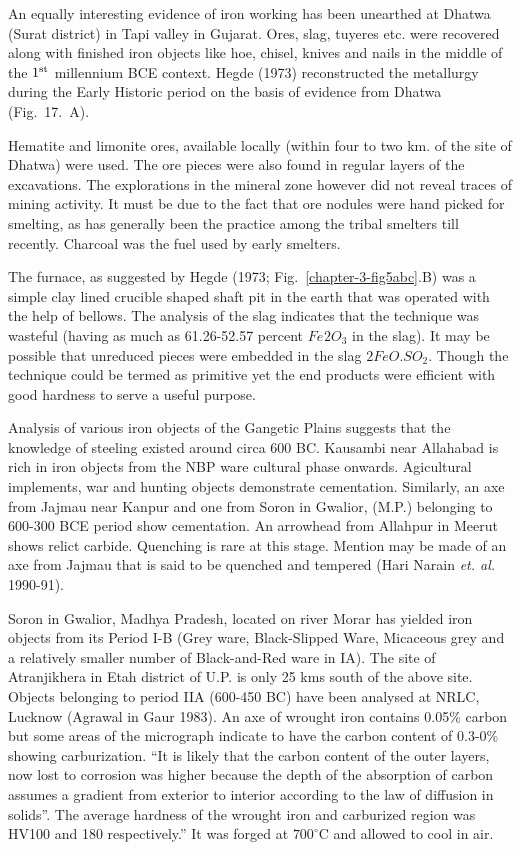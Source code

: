 An equally interesting evidence of iron working has been unearthed at Dhatwa (Surat district) in Tapi valley in Gujarat. Ores, slag, tuyeres etc. were recovered along with finished iron objects like hoe, chisel, knives and nails in the middle of the $1^{\rm st}$ millennium BCE context. Hegde (1973) reconstructed the metallurgy during the Early Historic period on the basis of evidence from Dhatwa (Fig.~17.~A). 

Hematite and limonite ores, available locally (within four to two km. of the site of Dhatwa) were used. The ore pieces were also found in regular layers of the excavations. The explorations in the mineral zone however did not reveal traces of mining activity. It must be due to the fact that ore nodules were hand picked for smelting, as has generally been the practice among the tribal smelters till recently. Charcoal was the fuel used by early smelters. 

The furnace, as suggested by Hegde (1973; Fig.~\ref{chapter-3-fig5abc}.B) was a simple clay lined crucible shaped shaft pit in the earth that was operated with the help of bellows. The analysis of the slag indicates that the technique was wasteful (having as much as 61.26-52.57 percent $Fe_­­­­2O_3$ in the slag). It may be possible that unreduced pieces were embedded in the slag $2FeO. SO_2$. Though the technique could be termed as primitive yet the end products were efficient with good hardness to serve a useful purpose. 

Analysis of various iron objects of the Gangetic Plains suggests that the knowledge of steeling existed around circa 600 BC. Kausambi near Allahabad is rich in iron objects from the NBP ware cultural phase onwards. Agicultural implements, war and hunting objects demonstrate cementation. Similarly, an axe from Jajmau near Kanpur and one from Soron in Gwalior, (M.P.) belonging to 600-300 BCE period show cementation. An arrowhead from Allahpur in Meerut shows relict carbide. Quenching is rare at this stage. Mention may be made of an axe from Jajmau that is said to be quenched and tempered (Hari Narain {\it et. al.} 1990-91). 

Soron in Gwalior, Madhya Pradesh, located on river Morar has yielded iron objects from its Period I-B (Grey ware, Black-Slipped Ware, Micaceous grey and a relatively smaller number of Black-and-Red ware in IA). The site of Atranjikhera in Etah district of U.P. is only 25 kms south of the above site. Objects belonging to period IIA (600-450 BC) have been analysed at NRLC, Lucknow (Agrawal in Gaur 1983). An axe of wrought iron contains 0.05\% carbon but some areas of the micrograph indicate to have the carbon content of 0.3-0\% showing carburization. “It is likely that the carbon content of the outer layers, now lost to corrosion was higher because the depth of the absorption of carbon assumes a gradient from exterior to interior according to the law of diffusion in solids”. The average hardness of the wrought iron and carburized region was HV100 and 180 respectively.” It was forged at $700^\circ$C and allowed to cool in air. 


